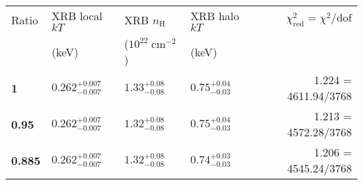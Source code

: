 \documentclass[preprint2,tighten,trackchanges]{aastex6}
\newcommand*{\mt}{\mathrm}
\newcommand*{\unit}[1]{\;\mt{#1}}  %
\begin{document}
\begin{table*}[!h]
    \begin{tabular}{@{}llllr@{}}
    \toprule
    Ratio & XRB local $kT$ & XRB $n_\mathrm{H}$ & XRB halo $kT$
           & $\chi^2_{\mathrm{red}} = \chi^2/\mathrm{dof}$ \\
     & (keV) & ($10^{22} \unit{cm^{-2}}$) & (keV) &  \\
    \midrule
    \textbf{1} & ${0.262}^{+0.007}_{-0.007}$ & ${1.33}^{+0.08}_{-0.08}$ & ${0.75}^{+0.04}_{-0.03}$
          & 1.224 = 4611.94/3768 \\
    \textbf{0.95} & ${0.262}^{+0.007}_{-0.007}$ & $1.32^{+0.08}_{-0.08}$ & $0.75^{+0.04}_{-0.03}$ %
          & 1.213 = 4572.28/3768 \\
    \textbf{0.885} & ${0.262}^{+0.007}_{-0.007}$ & ${1.32}^{+0.08}_{-0.08}$ & ${0.74}^{+0.03}_{-0.03}$
          & 1.206 = 4545.24/3768 \\
    \bottomrule
    \end{tabular}
\end{table*}

\end{document}
